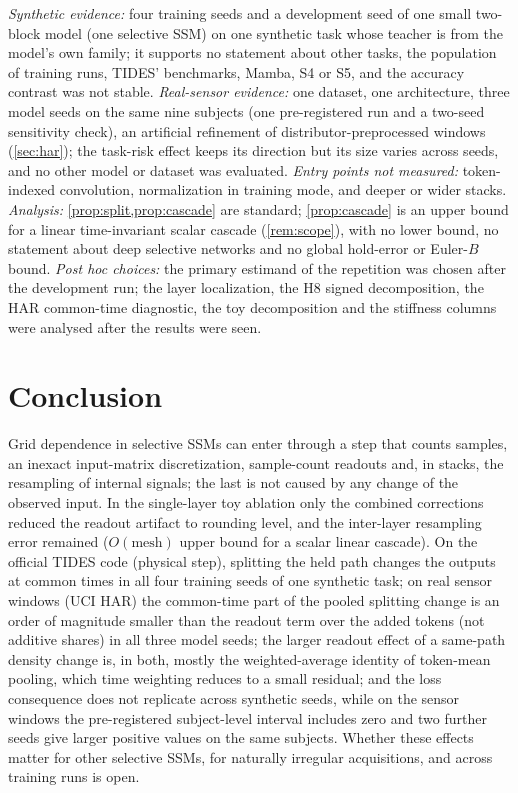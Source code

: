\documentclass{article}
\theoremstyle{plain}
\theoremstyle{definition}
\theoremstyle{remark}
\begin{document}
\emph{Synthetic evidence:} four training seeds and a development seed of one small two-block model (one selective SSM) on one synthetic task whose teacher is from the model's own family; it supports no statement about other tasks, the population of training runs, TIDES' benchmarks, Mamba, S4 or S5, and the accuracy contrast was not stable. \emph{Real-sensor evidence:} one dataset, one architecture, three model seeds on the same nine subjects (one pre-registered run and a two-seed sensitivity check), an artificial refinement of distributor-preprocessed windows (\cref{sec:har}); the task-risk effect keeps its direction but its size varies across seeds, and no other model or dataset was evaluated.
\emph{Entry points not measured:} token-indexed convolution, normalization in training mode, and deeper or wider stacks.
\emph{Analysis:} \cref{prop:split,prop:cascade} are standard; \cref{prop:cascade} is an upper bound for a linear time-invariant scalar cascade (\cref{rem:scope}), with no lower bound, no statement about deep selective networks and no global hold-error or Euler-$B$ bound.
\emph{Post hoc choices:} the primary estimand of the repetition was chosen after the development run; the layer localization, the H8 signed decomposition, the HAR common-time diagnostic, the toy decomposition and the stiffness columns were analysed after the results were seen.

\section{Conclusion}
\label{sec:conclusion}

Grid dependence in selective SSMs can enter through a step that counts samples, an inexact input-matrix discretization, sample-count readouts and, in stacks, the resampling of internal signals; the last is not caused by any change of the observed input.
In the single-layer toy ablation only the combined corrections reduced the readout artifact to rounding level, and the inter-layer resampling error remained ($O(\text{mesh})$ upper bound for a scalar linear cascade).
On the official TIDES code (physical step), splitting the held path changes the outputs at common times in all four training seeds of one synthetic task; on real sensor windows (UCI HAR) the common-time part of the pooled splitting change is an order of magnitude smaller than the readout term over the added tokens (not additive shares) in all three model seeds; the larger readout effect of a same-path density change is, in both, mostly the weighted-average identity of token-mean pooling, which time weighting reduces to a small residual; and the loss consequence does not replicate across synthetic seeds, while on the sensor windows the pre-registered subject-level interval includes zero and two further seeds give larger positive values on the same subjects.
Whether these effects matter for other selective SSMs, for naturally irregular acquisitions, and across training runs is open.\label{body-end}
\end{document}
